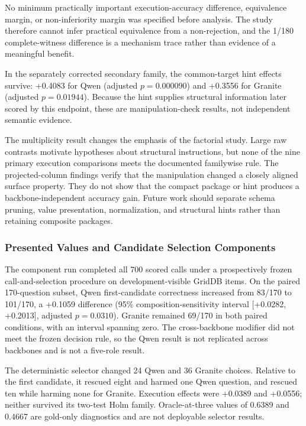 \documentclass[information,article,submit,moreauthors]{Definitions/mdpi}
\begin{document}
No minimum practically important execution-accuracy difference, equivalence margin, or non-inferiority margin was specified before analysis. The study therefore cannot infer practical equivalence from a non-rejection, and the 1/180 complete-witness difference is a mechanism trace rather than evidence of a meaningful benefit.

In the separately corrected secondary family, the common-target hint effects survive: +0.4083 for Qwen (adjusted $p=0.000090$) and +0.3556 for Granite (adjusted $p=0.01944$). Because the hint supplies structural information later scored by this endpoint, these are manipulation-check results, not independent semantic evidence.

The multiplicity result changes the emphasis of the factorial study. Large raw contrasts motivate hypotheses about structural instructions, but none of the nine primary execution comparisons meets the documented familywise rule. The projected-column findings verify that the manipulation changed a closely aligned surface property. They do not show that the compact package or hint produces a backbone-independent accuracy gain. Future work should separate schema pruning, value presentation, normalization, and structural hints rather than retaining composite packages.

\subsubsection{Presented Values and Candidate Selection Components}

The component run completed all 700 scored calls under a prospectively frozen call-and-selection procedure on development-visible GridDB items. On the paired 170-question subset, Qwen first-candidate correctness increased from 83/170 to 101/170, a +0.1059 difference (95\% composition-sensitivity interval [+0.0282, +0.2013], adjusted $p=0.0310$). Granite remained 69/170 in both paired conditions, with an interval spanning zero. The cross-backbone modifier did not meet the frozen decision rule, so the Qwen result is not replicated across backbones and is not a five-role result.

The deterministic selector changed 24 Qwen and 36 Granite choices. Relative to the first candidate, it rescued eight and harmed one Qwen question, and rescued ten while harming none for Granite. Execution effects were +0.0389 and +0.0556; neither survived its two-test Holm family. Oracle-at-three values of 0.6389 and 0.4667 are gold-only diagnostics and are not deployable selector results.
\end{document}
